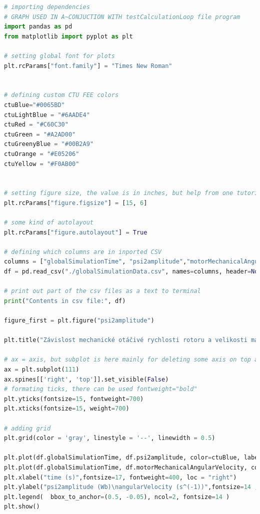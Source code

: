 \documentclass[a4paper, twoside, 11pt]{article}
\begin{document}
			\begin{lstlisting}[language={python}, caption={Ukázka python skriptu pro vykreslení časové závislosti mechanické otáčivé rychlosti rotoru $\Omega$ a velikosti magnetického toku rotoru \gls{symbol:psi2}.}, label={lst:python-skript-tok-rychlost}]
# importing dependencies
# GRAPH USED IN A~CONJUCTION WITH testCalculationLoop file program
import pandas as pd
from matplotlib import pyplot as plt

# setting global font for plots
plt.rcParams["font.family"] = "Times New Roman"


# defining custom CTU FEE colors
ctuBlue="#0065BD"
ctuLightBlue = "#6AADE4"
ctuRed = "#C60C30"
ctuGreen = "#A2AD00"
ctuGreenyBlue = "#00B2A9"
ctuOrange = "#E05206"
ctuYellow = "#F0AB00"


# setting figure size, the value is in inches, but help from one tutorial gives info, that because of dpi it translates to pixels like inches * 100 = pixels
plt.rcParams["figure.figsize"] = [15, 6]

# some kind of autolayout
plt.rcParams["figure.autolayout"] = True

# defining which columns are in inported CSV
columns = ["globalSimulationTime", "psi2amplitude","motorMechanicalAngularVelocity", "idRegulatorMeasuredValue", "idRegulatorWantedValue", "velocityRegulatorWantedValue", "velocityRegulatorSaturationOutput", "velocityRegulatorClampingStatus", "fluxRegulatorISum"]
df = pd.read_csv("./globalSimulationData.csv", names=columns, header=None, skiprows=0, nrows=10000000)

# print out part of the csv files as a text to terminal
print("Contents in csv file:", df)

figure_first = plt.figure("psi2amplitude")

plt.title("Závislost mechanické otáčivé rychlosti rotoru a velikosti magnetického toku rotoru na čase", fontsize=22, fontweight=700)

# ax = axis, but subplot is here mainly for deleting some axis on top and right
ax = plt.subplot(111)
ax.spines[['right', 'top']].set_visible(False)
# formating ticks, there can be used fontweight="bold"
plt.yticks(fontsize=15, fontweight=700)
plt.xticks(fontsize=15, weight=700)

# adding grid
plt.grid(color = 'gray', linestyle = '--', linewidth = 0.5)

plt.plot(df.globalSimulationTime, df.psi2amplitude, color=ctuBlue, label="psi2amplitude")
plt.plot(df.globalSimulationTime, df.motorMechanicalAngularVelocity, color=ctuRed, label="angularVelocity")
plt.xlabel("time (s)",fontsize=17, fontweight=400, loc = "right")
plt.ylabel("psi2amplitude (Wb)\nangularVelocity (s^(-1))",fontsize=14 ,fontweight=400, loc = "top", rotation=0)
plt.legend(  bbox_to_anchor=(0.5, -0.05), ncol=2, fontsize=14 )
plt.show()\end{lstlisting}
\end{document}
